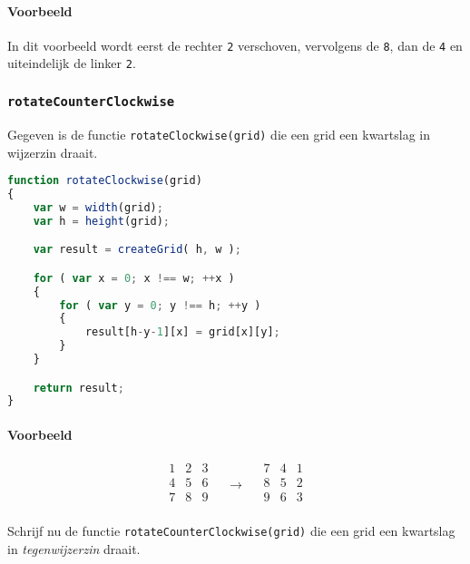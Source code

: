 \documentclass{khlexamen}
\begin{document}
\paragraph{Voorbeeld}
\begin{center}
\end{center}
In dit voorbeeld wordt eerst de rechter {\tt 2} verschoven, vervolgens
de {\tt 8}, dan de {\tt 4} en uiteindelijk de linker {\tt 2}.

\vskip8mm
\answerlines[13]


\clearpage
\ANSWERPAGE

\subsubsection{{\tt rotateCounterClockwise}}
Gegeven is de functie {\tt rotateClockwise(grid)} die een grid een kwartslag in wijzerzin draait.
\begin{center}
\begin{minipage}{.8\linewidth}
\begin{lstlisting}[language=javascript]
function rotateClockwise(grid)
{
    var w = width(grid);
    var h = height(grid);

    var result = createGrid( h, w );

    for ( var x = 0; x !== w; ++x )
    {
        for ( var y = 0; y !== h; ++y )
        {
            result[h-y-1][x] = grid[x][y];
        }
    }

    return result;
}
\end{lstlisting}
\end{minipage}
\end{center}

\paragraph{Voorbeeld}
\[
  \begin{array}{ccc}
    1 & 2 & 3 \\
    4 & 5 & 6 \\
    7 & 8 & 9 \\
  \end{array}
  \quad\rightarrow\quad
  \begin{array}{ccc}
    7 & 4 & 1 \\
    8 & 5 & 2 \\
    9 & 6 & 3 \\
  \end{array}
\]

Schrijf nu de functie {\tt rotateCounterClockwise(grid)} die een grid
een kwartslag in \emph{tegenwijzerzin} draait.

\vskip4mm
\answerlines[8]
\clearpage
\ANSWERPAGE
\clearpage
\answerlines
\end{document}

